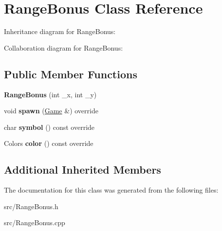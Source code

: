 \hypertarget{class_range_bonus}{}\section{Range\+Bonus Class Reference}
\label{class_range_bonus}


Inheritance diagram for Range\+Bonus\+:


Collaboration diagram for Range\+Bonus\+:
\subsection*{Public Member Functions}
\begin{DoxyCompactItemize}
\item 
\mbox{\label{class_range_bonus_adfa5b3462458f2df0858f689a572ab4f}} 
{\bfseries Range\+Bonus} (int \+\_\+x, int \+\_\+y)
\item 
\mbox{\label{class_range_bonus_a1a30337195be59901f02dc2311b3ab67}} 
void {\bfseries spawn} (\mbox{\hyperlink{class_game}{Game}} \&) override
\item 
\mbox{\label{class_range_bonus_a6bbb2c57b42be0d721e9065e81ca497c}} 
char {\bfseries symbol} () const override
\item 
\mbox{\label{class_range_bonus_ae709a5dd4b0303304ff26a01af8fa5d6}} 
Colors {\bfseries color} () const override
\end{DoxyCompactItemize}
\subsection*{Additional Inherited Members}


The documentation for this class was generated from the following files\+:\begin{DoxyCompactItemize}
\item 
src/Range\+Bonus.\+h\item 
src/Range\+Bonus.\+cpp\end{DoxyCompactItemize}
